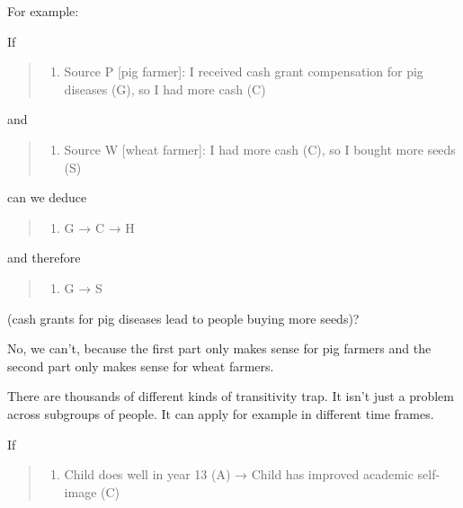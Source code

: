 \documentclass[
]{book}
\providecommand{\tightlist}{%
  \setlength{\itemsep}{0pt}\setlength{\parskip}{0pt}}
\begin{document}
For example:

If

\begin{quote}
\begin{enumerate}
\def\labelenumi{\arabic{enumi})}
\tightlist
\item
  Source P {[}pig farmer{]}: I received cash grant compensation for pig diseases (G), so I had more cash (C)
\end{enumerate}
\end{quote}

and

\begin{quote}
\begin{enumerate}
\def\labelenumi{\arabic{enumi})}
\setcounter{enumi}{1}
\tightlist
\item
  Source W {[}wheat farmer{]}: I had more cash (C), so I bought more seeds (S)
\end{enumerate}
\end{quote}

can we deduce

\begin{quote}
\begin{enumerate}
\def\labelenumi{\arabic{enumi})}
\setcounter{enumi}{2}
\tightlist
\item
  G → C → H
\end{enumerate}
\end{quote}

and therefore

\begin{quote}
\begin{enumerate}
\def\labelenumi{\arabic{enumi})}
\setcounter{enumi}{3}
\tightlist
\item
  G → S
\end{enumerate}
\end{quote}

(cash grants for pig diseases lead to people buying more seeds)?

No, we can't, because the first part only makes sense for pig farmers and the second part only makes sense for wheat farmers.

There are thousands of different kinds of transitivity trap. It isn't just a problem across subgroups of people. It can apply for example in different time frames.

If

\begin{quote}
\begin{enumerate}
\def\labelenumi{\arabic{enumi})}
\tightlist
\item
  Child does well in year 13 (A) → Child has improved academic self-image (C)
\end{enumerate}
\end{quote}
\end{document}
